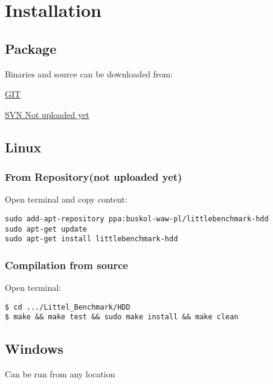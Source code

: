 \hypertarget{Installation}{
\section{Installation}
\label{Installation}
}

\subsection{Package}
Binaries and source can be downloaded from:
\begin{description}
\item \href{http://github.com/str0g/LittleBenchmark/tree/master/HDD/Release}{GIT}
\item \href{https://subversion.assembla.com/svn/littlebenchmark-hdd/}{SVN Not uploaded yet}
\end{description}

\subsection{Linux}

\subsubsection{From Repository(not uploaded yet)}
Open terminal and copy content:
\begin{verbatim}
sudo add-apt-repository ppa:buskol-waw-pl/littlebenchmark-hdd
sudo apt-get update
sudo apt-get install littlebenchmark-hdd
\end{verbatim}

\subsubsection{Compilation from source}
Open terminal:
\begin{verbatim}
$ cd .../Littel_Benchmark/HDD
$ make && make test && sudo make install && make clean
\end{verbatim}
\subsection{Windows}
Can be run from any location

